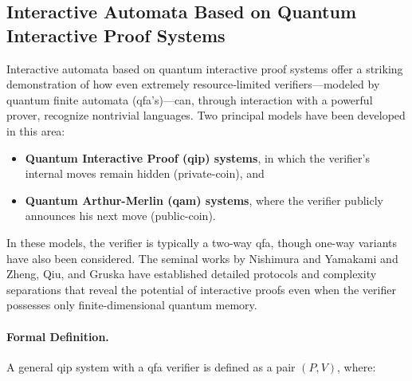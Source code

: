 \subsection{Interactive Automata Based on Quantum Interactive Proof Systems}
\label{sec:interactive-automata}

Interactive automata based on quantum interactive proof systems offer a striking demonstration of how even extremely resource‐limited verifiers—modeled by quantum finite automata (qfa's)—can, through interaction with a powerful prover, recognize nontrivial languages. Two principal models have been developed in this area:
  
\begin{itemize}
  \item \textbf{Quantum Interactive Proof (\gls{qip}) systems}, in which the verifier's internal moves remain hidden (private-coin), and
  \item \textbf{Quantum Arthur-Merlin (\gls{qam}) systems}, where the verifier publicly announces his next move (public-coin).
\end{itemize}

In these models, the verifier is typically a two-way qfa, though one-way variants have also been considered. The seminal works by Nishimura and Yamakami \cite{nishimura2009application, nishimura2015interactive} and Zheng, Qiu, and Gruska \cite{zheng2015power} have established detailed protocols and complexity separations that reveal the potential of interactive proofs even when the verifier possesses only finite-dimensional quantum memory.

\paragraph{Formal Definition.}
A general \gls{qip} system with a qfa verifier is defined as a pair $(P,V)$, where:

